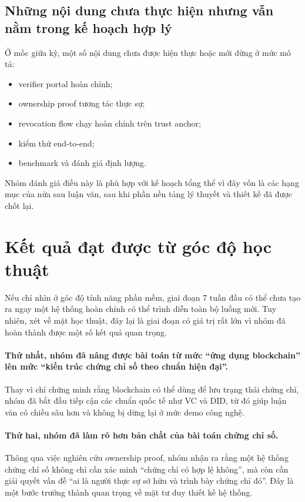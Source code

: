 \subsection{Những nội dung chưa thực hiện nhưng vẫn nằm trong kế hoạch hợp lý}
Ở mốc giữa kỳ, một số nội dung chưa được hiện thực hoặc mới dừng ở mức mô tả:
\begin{itemize}
    \item verifier portal hoàn chỉnh;
    \item ownership proof tương tác thực sự;
    \item revocation flow chạy hoàn chỉnh trên trust anchor;
    \item kiểm thử end-to-end;
    \item benchmark và đánh giá định lượng.
\end{itemize}

Nhóm đánh giá điều này là phù hợp với kế hoạch tổng thể vì đây vốn là các hạng mục của nửa sau luận văn, sau khi phần nền tảng lý thuyết và thiết kế đã được chốt lại.

\section{Kết quả đạt được từ góc độ học thuật}

Nếu chỉ nhìn ở góc độ tính năng phần mềm, giai đoạn 7 tuần đầu có thể chưa tạo ra ngay một hệ thống hoàn chỉnh có thể trình diễn toàn bộ luồng mới. Tuy nhiên, xét về mặt học thuật, đây lại là giai đoạn có giá trị rất lớn vì nhóm đã hoàn thành được một số kết quả quan trọng.

\paragraph{Thứ nhất, nhóm đã nâng được bài toán từ mức ``ứng dụng blockchain'' lên mức ``kiến trúc chứng chỉ số theo chuẩn hiện đại''.}
Thay vì chỉ chứng minh rằng blockchain có thể dùng để lưu trạng thái chứng chỉ, nhóm đã bắt đầu tiếp cận các chuẩn quốc tế như VC và DID, từ đó giúp luận văn có chiều sâu hơn và không bị dừng lại ở mức demo công nghệ.

\paragraph{Thứ hai, nhóm đã làm rõ hơn bản chất của bài toán chứng chỉ số.}
Thông qua việc nghiên cứu ownership proof, nhóm nhận ra rằng một hệ thống chứng chỉ số không chỉ cần xác minh ``chứng chỉ có hợp lệ không'', mà còn cần giải quyết vấn đề ``ai là người thực sự sở hữu và trình bày chứng chỉ đó''. Đây là một bước trưởng thành quan trọng về mặt tư duy thiết kế hệ thống.

